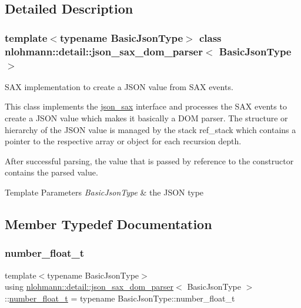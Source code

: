 \subsection{Detailed Description}
\subsubsection*{template$<$typename Basic\+Json\+Type$>$\newline
class nlohmann\+::detail\+::json\+\_\+sax\+\_\+dom\+\_\+parser$<$ Basic\+Json\+Type $>$}

S\+AX implementation to create a J\+S\+ON value from S\+AX events. 

This class implements the \hyperlink{structnlohmann_1_1json__sax}{json\+\_\+sax} interface and processes the S\+AX events to create a J\+S\+ON value which makes it basically a D\+OM parser. The structure or hierarchy of the J\+S\+ON value is managed by the stack {\ttfamily ref\+\_\+stack} which contains a pointer to the respective array or object for each recursion depth.

After successful parsing, the value that is passed by reference to the constructor contains the parsed value.


\begin{DoxyTemplParams}{Template Parameters}
{\em Basic\+Json\+Type} & the J\+S\+ON type \\
\hline
\end{DoxyTemplParams}


\subsection{Member Typedef Documentation}
\mbox{\label{classnlohmann_1_1detail_1_1json__sax__dom__parser_ad8da3aad0147b18b3cb76868480300fe}} 
\subsubsection{\texorpdfstring{number\+\_\+float\+\_\+t}{number\_float\_t}}
{\footnotesize\ttfamily template$<$typename Basic\+Json\+Type$>$ \\
using \hyperlink{classnlohmann_1_1detail_1_1json__sax__dom__parser}{nlohmann\+::detail\+::json\+\_\+sax\+\_\+dom\+\_\+parser}$<$ Basic\+Json\+Type $>$\+::\hyperlink{classnlohmann_1_1detail_1_1json__sax__dom__parser_ad8da3aad0147b18b3cb76868480300fe}{number\+\_\+float\+\_\+t} =  typename Basic\+Json\+Type\+::number\+\_\+float\+\_\+t}

